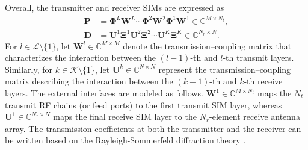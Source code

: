 \documentclass[twocolumn,10pt]{IEEEtran}
\newcommand{\vect}[1]{{\lowercase{\mbs{#1}}}}
\newcommand{\mbs}[1]{\bm{#1}}
\newcommand{\T}{{\scriptscriptstyle\mathsf{T}}}
\newcommand{\bphi}{\vect{\phi}}
\def\bD{{\mathbf{D}}}
\def\bP{{\mathbf{P}}}
\def\bU{{\mathbf{U}}}
\def\bW{{\mathbf{W}}}
\def\bxi{{\bm{\xi}}}
\def\bxi{{\bm{\xi}}}
\def\bXi{{\boldsymbol{\Xi}}}
\newcommand{\diag}[1][]{\ifthenelse{\isempty{#1}}{\text{diag}}{\text{diag}\left(#1\right)}}
\def\bPhi{{\boldsymbol{\Phi}}}
\def\bXi{{\boldsymbol{\Xi}}}
\begin{document}
	
%	
	Overall,   the  transmitter and receiver SIMs are expressed as
	\begin{align}
		\bP&=\bPhi^{L}\bW^{L}\cdots\bPhi^{2}\bW^{2}\bPhi^{1}\bW^{1}\in \mathbb{C}^{M \times N_{t}},\label{TransmitterSIM}\\
		\bD&=\bU^{1}\bXi^{1}\bU^{2}\bXi^{2}\cdots\bU^{K}\bXi^{K}\in \mathbb{C}^{N_{r} \times N}.
	\end{align}
		For $l\in\mathcal{L}\setminus\{1\}$, let $\mathbf{W}^{l}\in\mathbb{C}^{M\times M}$ denote the  transmission–coupling matrix that characterizes the interaction between the $(l-1)$-th and $l$-th transmit layers. 
	Similarly, for $k\in\mathcal{K}\setminus\{1\}$, let $\mathbf{U}^{k}\in\mathbb{C}^{N\times N}$ represent the transmission–coupling matrix describing the interaction between the $(k-1)$-th and $k$-th receive layers. 	The external interfaces are modeled as follows. $\mathbf{W}^{1}\in\mathbb{C}^{M\times N_t}$ maps the $N_t$ transmit RF chains (or feed ports) to the first transmit SIM layer, 
	whereas $\mathbf{U}^{1}\in\mathbb{C}^{N_r\times N}$ maps the final receive SIM layer to the $N_r$-element receive antenna array. The  transmission coefficients at both the transmitter and the receiver can be written based on the  Rayleigh-Sommerfeld diffraction theory \cite{An2023}.
	
\end{document}

